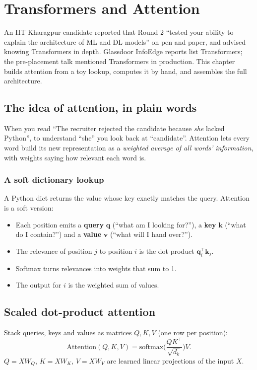 \chapter{Transformers and Attention}

An IIT Kharagpur candidate reported that Round 2 ``tested your ability to explain the architecture of ML and DL models'' on pen and paper,
and advised knowing Transformers in depth. Glassdoor InfoEdge reports list Transformers; the pre-placement talk mentioned Transformers in
production. This chapter builds attention from a toy lookup, computes it by hand, and assembles the full architecture.

\section{The idea of attention, in plain words}
When you read ``The recruiter rejected the candidate because \emph{she} lacked Python'', to understand ``she'' you look back at ``candidate''.
Attention lets every word build its new representation as a \emph{weighted average of all words' information}, with weights saying how relevant
each word is.

\subsection{A soft dictionary lookup}
A Python dict returns the value whose key exactly matches the query. Attention is a soft version:
\begin{itemize}
\item Each position emits a \textbf{query} $\mathbf q$ (``what am I looking for?''), a \textbf{key} $\mathbf k$ (``what do I contain?'') and a
  \textbf{value} $\mathbf v$ (``what will I hand over?'').
\item The relevance of position $j$ to position $i$ is the dot product $\mathbf q_i^\top\mathbf k_j$.
\item Softmax turns relevances into weights that sum to 1.
\item The output for $i$ is the weighted sum of values.
\end{itemize}

\section{Scaled dot-product attention}
Stack queries, keys and values as matrices $Q, K, V$ (one row per position):
\[ \boxed{\text{Attention}(Q, K, V) = \text{softmax}\Big(\frac{QK^\top}{\sqrt{d_k}}\Big)V.} \]
$Q = XW_Q$, $K = XW_K$, $V = XW_V$ are learned linear projections of the input $X$.


